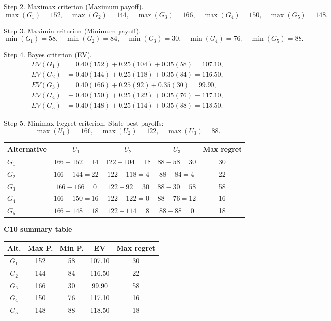 \begin{ExamProblems}
		Step 2. Maximax criterion (Maximum payoff).
		\[
		\max(G_1)=152,\quad \max(G_2)=144,\quad \max(G_3)=166,\quad \max(G_4)=150,\quad \max(G_5)=148.
		\]

		Step 3. Maximin criterion (Minimum payoff).
		\[
		\min(G_1)=58,\quad \min(G_2)=84,\quad \min(G_3)=30,\quad \min(G_4)=76,\quad \min(G_5)=88.
		\]

		Step 4. Bayes criterion (EV).
		\[
		\begin{aligned}
		EV(G_1)&=0.40(152)+0.25(104)+0.35(58)=107.10,\\
		EV(G_2)&=0.40(144)+0.25(118)+0.35(84)=116.50,\\
		EV(G_3)&=0.40(166)+0.25(92)+0.35(30)=99.90,\\
		EV(G_4)&=0.40(150)+0.25(122)+0.35(76)=117.10,\\
		EV(G_5)&=0.40(148)+0.25(114)+0.35(88)=118.50.
		\end{aligned}
		\]

		Step 5. Minimax Regret criterion.
		State best payoffs:
		\[
		\max(U_1)=166,\quad \max(U_2)=122,\quad \max(U_3)=88.
		\]
		\begin{center}
			\begin{tabular}{l c c c c}
				\toprule
				Alternative & $U_1$ & $U_2$ & $U_3$ & Max regret \\
				\midrule
				$G_1$ & $166-152=14$ & $122-104=18$ & $88-58=30$ & 30 \\
				$G_2$ & $166-144=22$ & $122-118=4$ & $88-84=4$ & 22 \\
				$G_3$ & $166-166=0$ & $122-92=30$ & $88-30=58$ & 58 \\
				$G_4$ & $166-150=16$ & $122-122=0$ & $88-76=12$ & 16 \\
				$G_5$ & $166-148=18$ & $122-114=8$ & $88-88=0$ & 18 \\
				\bottomrule
			\end{tabular}
		\end{center}

		\textbf{C10 summary table}
		\begin{center}
			\begin{tabular}{c c c c c}
				\toprule
				Alt. & Max P. & Min P. & EV & Max regret \\
				\midrule
				$G_1$ & 152 & 58 & 107.10 & 30 \\
				$G_2$ & 144 & 84 & 116.50 & 22 \\
				$G_3$ & 166 & 30 & 99.90 & 58 \\
				$G_4$ & 150 & 76 & 117.10 & 16 \\
				$G_5$ & 148 & 88 & 118.50 & 18 \\
				\bottomrule
			\end{tabular}
		\end{center}


\end{ExamProblems}
